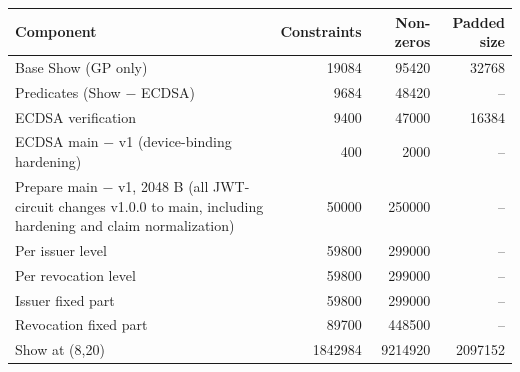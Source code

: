 \begin{tabular}{lrrr}
\toprule
Component & Constraints & Non-zeros & Padded size \\
\midrule
Base Show (GP only) & 19084 & 95420 & 32768 \\
Predicates (Show $-$ ECDSA) & 9684 & 48420 & -- \\
ECDSA verification & 9400 & 47000 & 16384 \\
ECDSA main $-$ v1 (device-binding hardening) & 400 & 2000 & -- \\
Prepare main $-$ v1, 2048 B (all JWT-circuit changes v1.0.0 to main, including hardening and claim normalization) & 50000 & 250000 & -- \\
Per issuer level & 59800 & 299000 & -- \\
Per revocation level & 59800 & 299000 & -- \\
Issuer fixed part & 59800 & 299000 & -- \\
Revocation fixed part & 89700 & 448500 & -- \\
Show at (8,20) & 1842984 & 9214920 & 2097152 \\
\bottomrule
\end{tabular}
